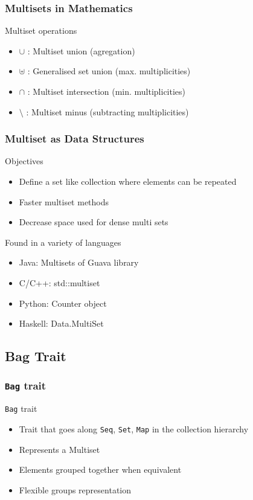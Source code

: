 \documentclass{beamer}
\begin{document}
\begin{frame}[fragile]
	\frametitle{Multisets in Mathematics}
	\begin{block}{Multiset operations}
		\begin{itemize}
			\item $\cup$ : Multiset union (agregation)
			\item $\uplus$ : Generalised set union (max. multiplicities)
			\item $\cap$ : Multiset intersection (min. multiplicities)
			\item $\setminus$ : Multiset minus (subtracting multiplicities)
		\end{itemize}
	\end{block}
\end{frame}

\begin{frame}[fragile]
	\frametitle{Multiset as Data Structures}
	\begin{block}{Objectives}
		\begin{itemize}
			\item Define a set like collection where elements can be repeated
			\item Faster multiset methods
			\item Decrease space used for dense multi sets
		\end{itemize}
	\end{block}
	\begin{block}{Found in a variety of languages}
		\begin{itemize}
			\item Java: Multisets of Guava library
			\item C/C++: std::multiset
			\item Python: Counter object
			\item Haskell: Data.MultiSet
		\end{itemize}
	\end{block}
\end{frame}


\subsection{Bag Trait}

\begin{frame}[fragile]
	\frametitle{\texttt{Bag} trait}
	\begin{block}{\texttt{Bag} trait}
		\begin{itemize}
			\item Trait that goes along \texttt{Seq}, \texttt{Set}, \texttt{Map} in the collection hierarchy
			\item Represents a Multiset 
			\item Elements grouped together when equivalent
			\item Flexible groups representation
		\end{itemize}
	\end{block}
\end{frame}
\end{document}
